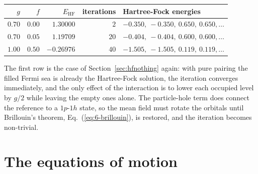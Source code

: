 \begin{center}
\renewcommand{\arraystretch}{1.2}
\begin{tabular}{rrrrl}
\toprule
$g$ & $f$ & $E_{\mathrm{HF}}$ & iterations & Hartree-Fock energies\\
\midrule
$0.70$ & $0.00$ & $1.30000$ & $2$ & $-0.350,\ -0.350,\ 0.650,\ 0.650,\dots$\\
$0.70$ & $0.05$ & $1.19709$ & $20$ & $-0.404,\ -0.404,\ 0.600,\ 0.600,\dots$\\
$1.00$ & $0.50$ & $-0.26976$ & $40$ & $-1.505,\ -1.505,\ 0.119,\ 0.119,\dots$\\
\bottomrule
\end{tabular}
\end{center}

The first row is the case of Section~\ref{sec:hfnothing} again: with pure
pairing the filled Fermi sea is already the Hartree-Fock solution, the
iteration converges immediately, and the only effect of the interaction is to
lower each occupied level by $g/2$ while leaving the empty ones alone.  The
particle-hole term does connect the reference to a $1p$-$1h$ state, so the
mean field must rotate the orbitals until Brillouin's theorem,
Eq.~(\ref{eq:6-brillouin}), is restored, and the iteration becomes
non-trivial.

\section{The equations of motion}
\label{sec:eom}

